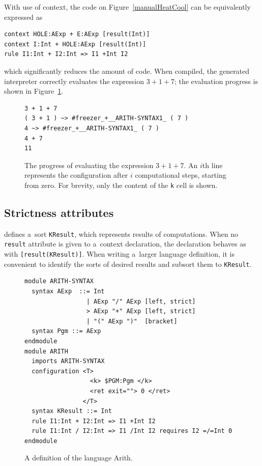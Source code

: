 \documentclass[nolot,nolof,nocover,printed]{fithesis3}
\begin{document}
With use of context, the code on Figure~\ref{manualHeatCool} can be equivalently expressed as
\begin{lstlisting}
context HOLE:AExp + E:AExp [result(Int)]
context I:Int + HOLE:AExp [result(Int)]
rule I1:Int + I2:Int => I1 +Int I2
\end{lstlisting}
which significantly reduces the amount of code. When compiled, the generated interpreter correctly evaluates the expression $3 + 1 + 7$; the evaluation progress is shown in Figure~\ref{contextEvaluation}.

\begin{figure}
\begin{lstlisting}
3 + 1 + 7
( 3 + 1 ) ~> #freezer_+__ARITH-SYNTAX1_ ( 7 )
4 ~> #freezer_+__ARITH-SYNTAX1_ ( 7 )
4 + 7
11
\end{lstlisting}
\caption{The progress of evaluating the expression $3 + 1 + 7$. An $i$th line represents the configuration after $i$ computational steps, starting from zero. For brevity, only the content of the \lstinline|k| cell is shown.}
\label{contextEvaluation}
\end{figure}

\subsection{Strictness attributes}
\K defines a~sort \lstinline|KResult|, which represents results of computations. When no \lstinline|result| attribute is given to a~context declaration, the declaration behaves as with \lstinline|[result(KResult)]|. When writing a~larger language definition, it is convenient to identify the sorts of desired results and subsort them to \lstinline|KResult|.

\begin{figure}
\begin{lstlisting}
module ARITH-SYNTAX
  syntax AExp  ::= Int
                 | AExp "/" AExp [left, strict]
                 > AExp "+" AExp [left, strict]
                 | "(" AExp ")"  [bracket]
  syntax Pgm ::= AExp
endmodule
module ARITH
  imports ARITH-SYNTAX
  configuration <T>
                  <k> $PGM:Pgm </k>
                  <ret exit=""> 0 </ret>
                </T>
  syntax KResult ::= Int
  rule I1:Int + I2:Int => I1 +Int I2
  rule I1:Int / I2:Int => I1 /Int I2 requires I2 =/=Int 0
endmodule
\end{lstlisting}
\caption{A definition of the language Arith.}
\label{arithFinal}
\end{figure}
\end{document}
